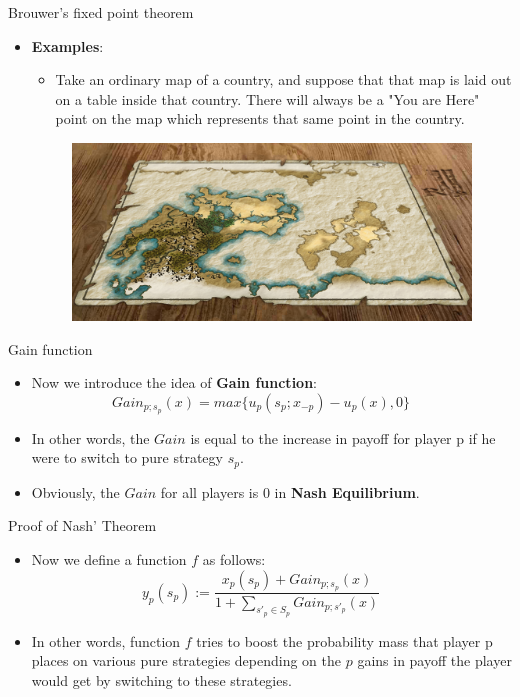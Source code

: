 \documentclass{beamer}
\begin{document}
\begin{frame}[fragile]{Brouwer's fixed point theorem}
	\begin{itemize}
		\item \textbf{Examples}:
		\begin{itemize}
			\item Take an ordinary map of a country, and suppose that that map is laid out on a table inside that country. There will always be a "You are Here" point on the map which represents that same point in the country.
		\end{itemize}
		\begin{figure}[H]
			\centering
			\includegraphics[width=0.7\linewidth]{001.jpg}\vspace{-10pt}
			\nonumber\vspace{-10pt}
		\end{figure}
	\end{itemize}
\end{frame}

\begin{frame}[fragile]{Gain function}
	\begin{itemize}[<+->]
		\item Now we introduce the idea of \textbf{Gain function}:\\
		\begin{equation}
		Gain_{p;s_p} (x) = max\{u_p(s_p;x_{-p})-u_p(x), 0\} \ \  \ \ \ \ \ \nonumber
		\end{equation}
		\item In other words, the $Gain$ is equal to the increase in payoff for player p if he were to switch to pure
		strategy $s_p$.
		\item Obviously, the $Gain$ for all players is 0 in \textbf{Nash Equilibrium}.
	\end{itemize}
\end{frame}

\begin{frame}[fragile]{Proof of Nash' Theorem}
	\begin{itemize}[<+->]
		\item Now we define a function $f$ as follows:
		 \begin{equation}
		 y_p(s_p) := \frac{x_p(s_p) + Gain_{p;s_p}(x)}{1 + \sum_{s'_p \in S_p} Gain_{p;s'_p}(x)} \ \ \ \ \ \ \ \nonumber
		 \end{equation}
		\item In other words, function $f$ tries to boost the probability mass that player p places on various pure strategies
		depending on the $p$ gains in payoff the player would get by switching to these strategies.
	\end{itemize}
\end{frame}
\end{document}

